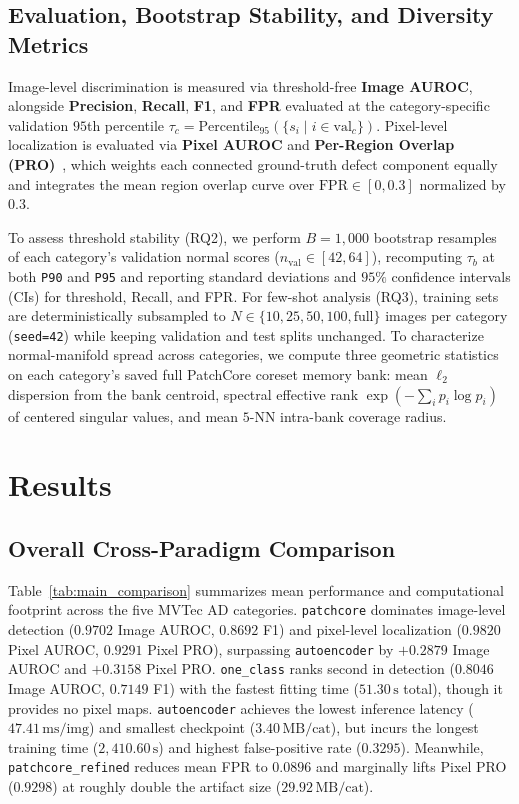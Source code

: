 \documentclass[conference]{IEEEtran}
\begin{document}
\subsection{Evaluation, Bootstrap Stability, and Diversity Metrics}
Image-level discrimination is measured via threshold-free \textbf{Image AUROC}, alongside \textbf{Precision}, \textbf{Recall}, \textbf{F1}, and \textbf{FPR} evaluated at the category-specific validation $95$th percentile $\tau_c = \text{Percentile}_{95}(\{s_i \mid i \in \text{val}_c\})$. Pixel-level localization is evaluated via \textbf{Pixel AUROC} and \textbf{Per-Region Overlap (PRO)}~\cite{bergmann2021mvtec}, which weights each connected ground-truth defect component equally and integrates the mean region overlap curve over $\text{FPR} \in [0, 0.3]$ normalized by $0.3$.

To assess threshold stability (RQ2), we perform $B=1{,}000$ bootstrap resamples of each category's validation normal scores ($n_{\text{val}} \in [42, 64]$), recomputing $\tau_b$ at both \texttt{P90} and \texttt{P95} and reporting standard deviations and $95\%$ confidence intervals (CIs) for threshold, Recall, and FPR. For few-shot analysis (RQ3), training sets are deterministically subsampled to $N \in \{10, 25, 50, 100, \text{full}\}$ images per category (\texttt{seed=42}) while keeping validation and test splits unchanged. To characterize normal-manifold spread across categories, we compute three geometric statistics on each category's saved full PatchCore coreset memory bank: mean $\ell_2$ dispersion from the bank centroid, spectral effective rank $\exp(-\sum_i p_i \log p_i)$ of centered singular values, and mean $5$-NN intra-bank coverage radius.

\section{Results}

\subsection{Overall Cross-Paradigm Comparison}
Table~\ref{tab:main_comparison} summarizes mean performance and computational footprint across the five MVTec AD categories. \texttt{patchcore} dominates image-level detection ($0.9702$ Image AUROC, $0.8692$ F1) and pixel-level localization ($0.9820$ Pixel AUROC, $0.9291$ Pixel PRO), surpassing \texttt{autoencoder} by $+0.2879$ Image AUROC and $+0.3158$ Pixel PRO. \texttt{one\_class} ranks second in detection ($0.8046$ Image AUROC, $0.7149$ F1) with the fastest fitting time ($51.30\,\text{s}$ total), though it provides no pixel maps. \texttt{autoencoder} achieves the lowest inference latency ($47.41\,\text{ms/img}$) and smallest checkpoint ($3.40\,\text{MB/cat}$), but incurs the longest training time ($2{,}410.60\,\text{s}$) and highest false-positive rate ($0.3295$). Meanwhile, \texttt{patchcore\_refined} reduces mean FPR to $0.0896$ and marginally lifts Pixel PRO ($0.9298$) at roughly double the artifact size ($29.92\,\text{MB/cat}$).
\end{document}
